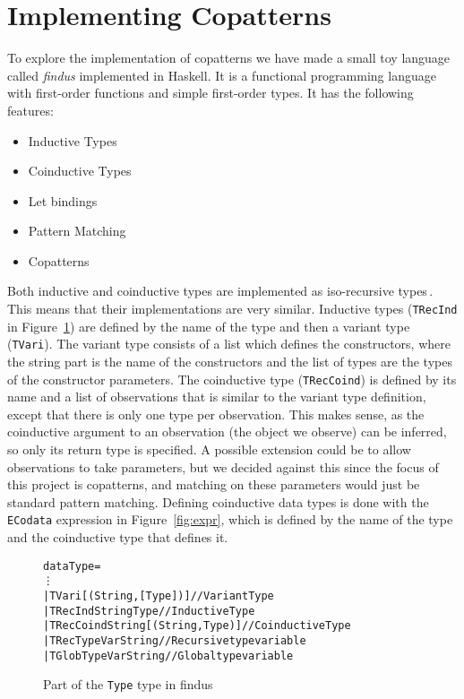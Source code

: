 \section{Implementing Copatterns}
\label{sec:implementing-copatterns}
To explore the implementation of copatterns we have made a small toy language called \textit{findus} implemented in Haskell. It is a functional programming language with first-order functions and simple first-order types. It has the following features:

\begin{itemize}
\item Inductive Types
\item Coinductive Types
\item Let bindings
\item Pattern Matching 
\item Copatterns
\end{itemize}

Both inductive and coinductive types are implemented as iso-recursive types\,\cite[p. 275]{Pierce:2002:TPL:509043}. This means that their implementations are very similar. Inductive types (\texttt{TRecInd} in Figure~\ref{fig:types}) are defined by the name of the type and then a variant type (\texttt{TVari}). The variant type consists of a list which defines the constructors, where the string part is the name of the constructors and the list of types are the types of the constructor parameters. The coinductive type (\texttt{TRecCoind}) is defined by its name and a list of observations that is similar to the variant type definition, except that there is only one type per observation. This makes sense, as the coinductive argument to an observation (the object we observe) can be inferred, so only its return type is specified. A possible extension could be to allow observations to take parameters, but we decided against this since the focus of this project is copatterns, and matching on these parameters would just be standard pattern matching. Defining coinductive data types is done with the \texttt{ECodata} expression in Figure~\ref{fig:expr}, which is defined by the name of the type and the coinductive type that defines it.

\begin{figure}
\begin{alltt}
data Type =
  \vdots
  | TVari [(String, [Type])]          // Variant Type
  | TRecInd String Type               // Inductive Type
  | TRecCoind String [(String, Type)] // Coinductive Type
  | TRecTypeVar String                // Recursive type variable
  | TGlobTypeVar String               // Global type variable
\end{alltt}
\caption{Part of the \texttt{Type} type in findus}
\label{fig:types}
\end{figure}

